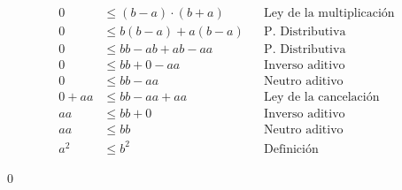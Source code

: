 \documentclass[11pt]{article}
\begin{document}
\begin{enumerate}
\begin{enumerate}[label=\roman*)]
\begin{align*}
   0 &\leq (b-a)\cdot (b+a) && \text{Ley de la multiplicación}\\
   0 &\leq b(b-a)+a(b-a) && \text{P. Distributiva}\\
   0 &\leq bb-ab+ab-aa &&\text{P. Distributiva}\\
   0 &\leq bb + 0 -aa && \text{Inverso aditivo}\\
   0 &\leq bb -aa && \text{Neutro aditivo}\\
   0 + aa &\leq bb -aa + aa && \text{Ley de la cancelación}\\
   aa &\leq bb + 0 && \text{Inverso aditivo}\\
   aa &\leq bb &&\text{Neutro aditivo}\\
   a^2 &\leq b^2 && \text{Definición}
  \end{align*}
 \end{enumerate} \qed
\end{enumerate}
\end{document}
